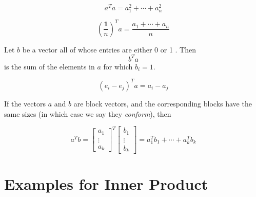 \begin{corollary}[向量每一项的平方和]
    \begin{equation} a^{T} a=a_{1}^{2}+\cdots+a_{n}^{2} \end{equation}
\end{corollary}

\begin{corollary}[向量元素的平均值]
    \begin{equation} (\frac{\mathbf{1}}{n})^{T} a= \frac{a_{1}+\cdots+a_{n}}{n}  \end{equation}
\end{corollary}

\begin{corollary}
    Let $ b $ be a vector all of whose entries are either 0 or 1 . Then \begin{equation} b^{T} a \end{equation} is the sum of the elements in $ a $ for which $ b_{i}=1 $.
\end{corollary}

\begin{corollary}[Differencing]
    \begin{equation} \left(e_{i}-e_{j}\right)^{T} a=a_{i}-a_{j} \end{equation}
\end{corollary}

\begin{definition}
    If the vectors $ a $ and $ b $ are block vectors, and the corresponding blocks have the same sizes (in which case we say they \textit{conform}), then 

    \begin{equation} a^{T} b=\left[\begin{array}{c}a_{1} \\ \vdots \\ a_{k}\end{array}\right]^{T}\left[\begin{array}{c}b_{1} \\ \vdots \\ b_{k}\end{array}\right]=a_{1}^{T} b_{1}+\cdots+a_{k}^{T} b_{k} \end{equation}
\end{definition}


\section{Examples for Inner Product}

